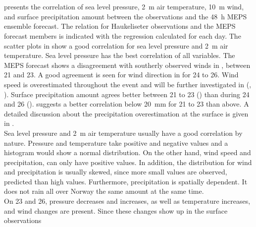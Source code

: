 \\
\\
 presents the correlation of sea level pressure, \SI{2}{\metre} air temperature, \SI{10}{\metre} wind, and surface precipitation amount  between the observations and the \SI{48}{\hour} MEPS ensemble forecast. The relation for Haukeliseter observations and the MEPS forecast members is indicated with the regression calculated for each day. The scatter plots in  show a good correlation for sea level pressure and \SI{2}{\metre} air temperature.
Sea level pressure has the best correlation of  all variables. 
The MEPS forecast shows a disagreement with southerly observed winds in , between \num{21} and \SI{23}{\dec}. A good agreement is seen for wind direction in  for \num{24} to \SI{26}{\dec}. 
Wind speed is overestimated throughout the event and will be further investigated in  (, ). 
Surface precipitation amount agrees better between \num{21} to \SI{23}{\dec} () than during \num{24} and \SI{26}{\dec} ().  suggests a better correlation below \SI{20}{\mm} for \num{21} to \SI{23}{\dec} than above. A detailed discussion about the precipitation overestimation at the surface is given in .
\\
Sea level pressure and \SI{2}{\metre} air temperature usually have a good correlation by nature. Pressure and temperature take positive and negative values and a histogram would show a normal distribution.
On the other hand, wind speed and precipitation, can only have positive values. In addition, the distribution for wind and precipitation is usually skewed, since more small values are observed, predicted than high values.
Furthermore, precipitation is spatially dependent. It does not rain all over Norway the same amount at the same time.
\\
On \num{23} and \SI{26}{\dec}, pressure decreases and increases, as well as temperature increases, and wind changes are present. Since these changes show up in the surface observations %
